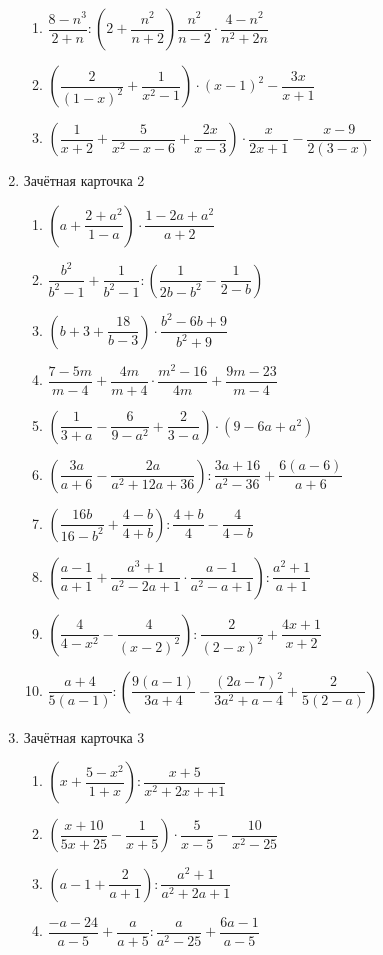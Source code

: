 \documentclass[12pt, a4paper]{article}
\begin{document}
\begin{enumerate}
\begin{enumerate}[label=\asbuk*)]
		\item \( \dfrac{8-n^3}{2+n}:\left( 2+\dfrac{n^2}{n+2} \right) \dfrac{n^2}{n-2}\cdot\dfrac{4-n^2}{n^2+2n}\)
		\item \( \left( \dfrac{2}{(1-x)^2}+\dfrac{1}{x^2-1} \right)\cdot(x-1)^2-\dfrac{3x}{x+1} \)
		\item \( \left( \dfrac{1}{x+2}+\dfrac{5}{x^2-x-6}+\dfrac{2x}{x-3} \right)\cdot\dfrac{x}{2x+1}-\dfrac{x-9}{2(3-x)} \)
	\end{enumerate}
	\item Зачётная карточка 2
	\begin{enumerate}[label=\asbuk*)]
		\item \( \left( a+\dfrac{2+a^2}{1-a} \right)\cdot\dfrac{1-2a+a^2}{a+2} \)
		\item \( \dfrac{b^2}{b^2-1}+\dfrac{1}{b^2-1}:\left( \dfrac{1}{2b-b^2}-\dfrac{1}{2-b} \right) \)
		\item \( \left( b+3+\dfrac{18}{b-3} \right)\cdot\dfrac{b^2-6b+9}{b^2+9} \)
		\item \( \dfrac{7-5m}{m-4}+\dfrac{4m}{m+4} \cdot\dfrac{m^2-16}{4m}+\dfrac{9m-23}{m-4}\)
		\item \( \left( \dfrac{1}{3+a}-\dfrac{6}{9-a^2}+\dfrac{2}{3-a} \right)\cdot(9-6a+a^2) \)
		\item \( \left(  \dfrac{3a}{a+6}-\dfrac{2a}{a^2+12a+36}\right) :\dfrac{3a+16}{a^2-36}+\dfrac{6(a-6)}{a+6}\)
		\item \( \left( \dfrac{16b}{16-b^2}+\dfrac{4-b}{4+b} \right):\dfrac{4+b}{4}-\dfrac{4}{4-b} \)
		\item \( \left( \dfrac{a-1}{a+1}+\dfrac{a^3+1}{a^2-2a+1}\cdot\dfrac{a-1}{a^2-a+1} \right):\dfrac{a^2+1}{a+1} \)
		\item \( \left( \dfrac{4}{4-x^2}-\dfrac{4}{(x-2)^2} \right) :\dfrac{2}{(2-x)^2}+\dfrac{4x+1}{x+2}\)
		\item \( \dfrac{a+4}{5(a-1)}:\left( \dfrac{9(a-1)}{3a+4}-\dfrac{(2a-7)^2}{3a^2+a-4}+\dfrac{2}{5(2-a)} \right) \)
	\end{enumerate}
	\item Зачётная карточка 3
\begin{enumerate}[label=\asbuk*)]
	\item \( \left( x+\dfrac{5-x^2}{1+x} \right):\dfrac{x+5}{x^2+2x++1} \)
	\item \( \left( \dfrac{x+10}{5x+25} -\dfrac{1}{x+5}\right) \cdot\dfrac{5}{x-5}-\dfrac{10}{x^2-25}\)
	\item \( \left( a-1+\dfrac{2}{a+1} \right):\dfrac{a^2+1}{a^2+2a+1} \)
	\item \( \dfrac{-a-24}{a-5}+\dfrac{a}{a+5}:\dfrac{a}{a^2-25}+\dfrac{6a-1}{a-5} \)

\end{enumerate}
\end{enumerate}
\end{document}
